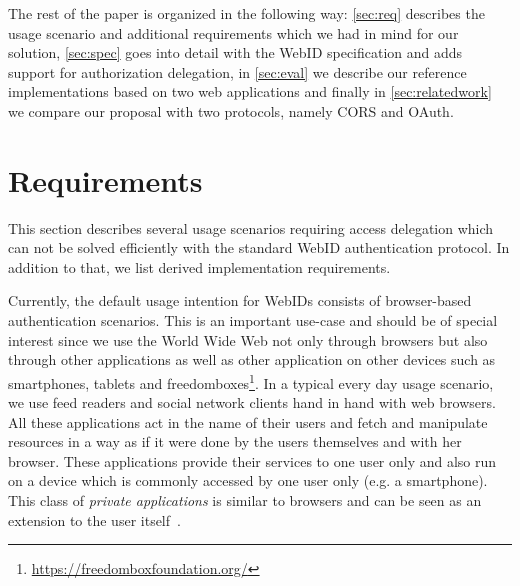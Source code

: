 \documentclass[a4paper]{llncs}
\begin{document}
The rest of the paper is organized in the following way:
\autoref{sec:req} describes the usage scenario and additional requirements which we had in mind for our solution,
\autoref{sec:spec} goes into detail with the WebID specification and adds support for authorization delegation,
in \autoref{sec:eval} we describe our reference implementations based on two web applications and finally
in \autoref{sec:relatedwork} we compare our proposal with two protocols, namely CORS and OAuth.



\section{Requirements}\label{sec:req}

This section describes several usage scenarios requiring access delegation which can not be solved efficiently with the standard WebID authentication protocol.
In addition to that, we list derived implementation requirements.



Currently, the default usage intention for WebIDs consists of browser-based authentication scenarios.
This is an important use-case and should be of special interest since we use the World Wide Web not only through browsers but also through other applications as well as other application on other devices such as smartphones, tablets and freedomboxes\footnote{\url{https://freedomboxfoundation.org/}}.
In a typical every day usage scenario, we use feed readers and social network clients hand in hand with web browsers.
All these applications act in the name of their users and fetch and manipulate resources in a way as if it were done by the users themselves and with her browser.
These applications provide their services to one user only and also run on a device which is commonly accessed by one user only (e.g. a smartphone).
This class of \textit{private applications} is similar to browsers and can be seen as an extension to the user itself~\cite{clark-a-1998-7-a}.
\end{document}
